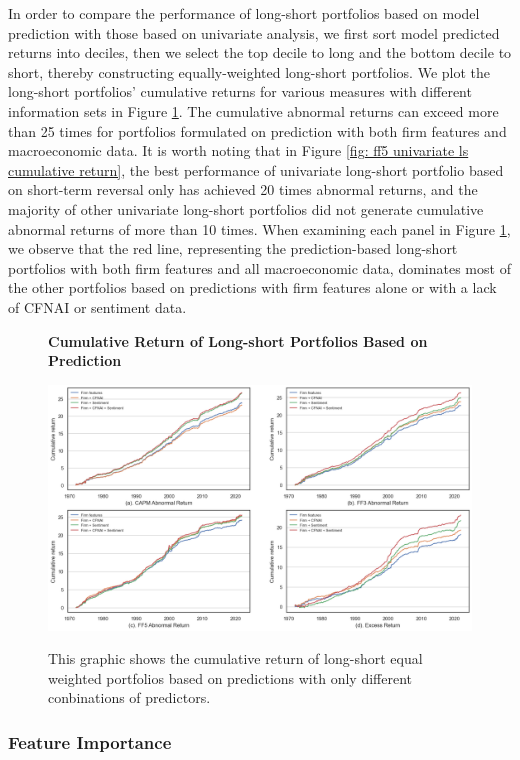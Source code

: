 In order to compare the performance of long-short portfolios based on model prediction with those based on univariate analysis, we first sort model predicted returns into deciles, then we select the top decile to long and the bottom decile to short, thereby constructing equally-weighted long-short portfolios. We plot the long-short portfolios' cumulative returns for various measures with different information sets in Figure \ref{fig: ls portfolios based on prediction}. The cumulative abnormal returns can exceed more than 25 times for portfolios formulated on prediction with both firm features and macroeconomic data. It is worth noting that in Figure \ref{fig: ff5 univariate ls cumulative return}, the best performance of univariate long-short portfolio based on short-term reversal only has achieved 20 times abnormal returns, and the majority of other univariate long-short portfolios did not generate cumulative abnormal returns of more than 10 times. When examining each panel in Figure \ref{fig: ls portfolios based on prediction}, we observe that the red line, representing the prediction-based long-short portfolios with both firm features and all macroeconomic data, dominates most of the other portfolios based on predictions with firm features alone or with a lack of CFNAI or sentiment data.

\begin{figure}[H]
  \centering
  \caption{\textbf{Cumulative Return of Long-short Portfolios Based on Prediction}}
  \includegraphics[width=.8\textwidth]{images/ls_portfolios_predictions.png}
  \label{fig: ls portfolios based on prediction}
  \caption*{\footnotesize{This graphic shows the cumulative return of long-short equal weighted portfolios based on predictions with only different conbinations of predictors.}}
\end{figure}
\subsubsection{Feature Importance}

